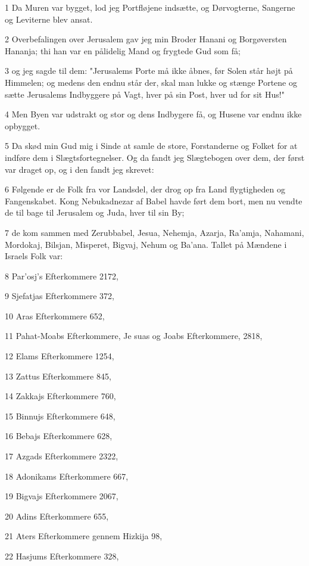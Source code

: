 \par 1 Da Muren var bygget, lod jeg Portfløjene indsætte, og Dørvogterne, Sangerne og Leviterne blev ansat.
\par 2 Overbefalingen over Jerusalem gav jeg min Broder Hanani og Borgøversten Hananja; thi han var en pålidelig Mand og frygtede Gud som få;
\par 3 og jeg sagde til dem: "Jerusalems Porte må ikke åbnes, før Solen står højt på Himmelen; og medens den endnu står der, skal man lukke og stænge Portene og sætte Jerusalems Indbyggere på Vagt, hver på sin Post, hver ud for sit Hus!"
\par 4 Men Byen var udstrakt og stor og dens Indbygere få, og Husene var endnu ikke opbygget.
\par 5 Da skød min Gud mig i Sinde at samle de store, Forstanderne og Folket for at indføre dem i Slægtsfortegnelser. Og da fandt jeg Slægtebogen over dem, der først var draget op, og i den fandt jeg skrevet:
\par 6 Følgende er de Folk fra vor Landsdel, der drog op fra Land flygtigheden og Fangenskabet. Kong Nebukadnezar af Babel havde ført dem bort, men nu vendte de til bage til Jerusalem og Juda, hver til sin By;
\par 7 de kom sammen med Zerubbabel, Jesua, Nehemja, Azarja, Ra'amja, Nahamani, Mordokaj, Bilsjan, Misperet, Bigvaj, Nehum og Ba'ana. Tallet på Mændene i Israels Folk var:
\par 8 Par'osj's Efterkommere 2172,
\par 9 Sjefatjas Efterkommere 372,
\par 10 Aras Efterkommere 652,
\par 11 Pahat-Moabs Efterkommere, Je suas og Joabs Efterkommere, 2818,
\par 12 Elams Efterkommere 1254,
\par 13 Zattus Efterkommere 845,
\par 14 Zakkajs Efterkommere 760,
\par 15 Binnujs Efterkommere 648,
\par 16 Bebajs Efterkommere 628,
\par 17 Azgads Efterkommere 2322,
\par 18 Adonikams Efterkommere 667,
\par 19 Bigvajs Efterkommere 2067,
\par 20 Adins Efterkommere 655,
\par 21 Aters Efterkommere gennem Hizkija 98,
\par 22 Hasjums Efterkommere 328,
